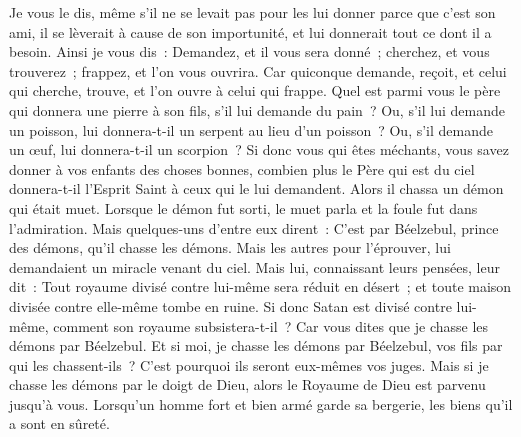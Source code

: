 \begin{multicols}{2}
Je vous le dis, même s'il ne se levait pas pour les lui donner parce que c'est son ami, il se lèverait à cause de son importunité, et lui donnerait tout ce dont il a besoin.
Ainsi je vous dis~: Demandez, et il vous sera donné~; cherchez, et vous trouverez~; frappez, et l'on vous ouvrira.
Car quiconque demande, reçoit, et celui qui cherche, trouve, et l'on ouvre à celui qui frappe.
Quel est parmi vous le père qui donnera une pierre à son fils, s'il lui demande du pain~? Ou, s'il lui demande un poisson, lui donnera-t-il un serpent au lieu d'un poisson~?
Ou, s'il demande un œuf, lui donnera-t-il un scorpion~?
Si donc vous qui êtes méchants, vous savez donner à vos enfants des choses bonnes, combien plus le Père qui est du ciel donnera-t-il l'Esprit Saint à ceux qui le lui demandent.
Alors il chassa un démon qui était muet. Lorsque le démon fut sorti, le muet parla et la foule fut dans l'admiration.
Mais quelques-uns d'entre eux dirent~: C'est par Béelzebul, prince des démons, qu'il chasse les démons.
Mais les autres pour l'éprouver, lui demandaient un miracle venant du ciel.
Mais lui, connaissant leurs pensées, leur dit~: Tout royaume divisé contre lui-même sera réduit en désert~; et toute maison divisée contre elle-même tombe en ruine.
Si donc Satan est divisé contre lui-même, comment son royaume subsistera-t-il~? Car vous dites que je chasse les démons par Béelzebul.
Et si moi, je chasse les démons par Béelzebul, vos fils par qui les chassent-ils~? C'est pourquoi ils seront eux-mêmes vos juges.
Mais si je chasse les démons par le doigt de Dieu, alors le Royaume de Dieu est parvenu jusqu'à vous.
Lorsqu'un homme fort et bien armé garde sa bergerie, les biens qu'il a sont en sûreté.

\end{multicols}
